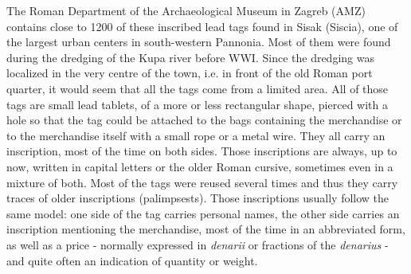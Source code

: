 \documentclass[amsthm,ebook]{saparticle}
\begin{document}
The Roman Department of the Archaeological Museum in Zagreb (AMZ) contains close to 1200 of these inscribed lead tags
found in Sisak (Siscia), one of the largest urban centers in south-western Pannonia. Most of them were found during the
dredging of the Kupa river before WWI. Since the dredging was localized in the very centre of the town, i.e. in front
of the old Roman port quarter, it would seem that all the tags come from a limited area. All of those tags are small
lead tablets, of a more or less rectangular shape, pierced with a hole so that the tag could be attached to the bags
containing the merchandise or to the merchandise itself with a small rope or a metal wire. They all carry an
inscription, most of the time on both sides. Those inscriptions are always, up to now, written in capital letters or
the older Roman cursive, sometimes even in a mixture of both. Most of the tags were reused several times and thus they
carry traces of older inscriptions (palimpsests). Those inscriptions usually follow the same model: one side of the tag
carries personal names, the other side carries an inscription mentioning the merchandise, most of the time in an
abbreviated form, as well as a price - normally expressed in \emph{denarii} or fractions of the \emph{denarius} - and quite often an
indication of quantity or weight.
\end{document}
